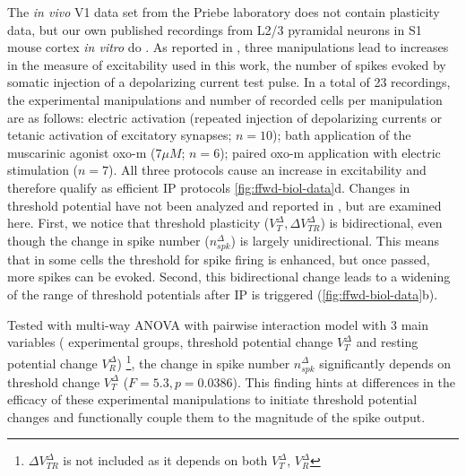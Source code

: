 The \textit{in vivo} V1 data set \citep{Li2020-ej} from the Priebe laboratory does not contain plasticity data,
        but our own published recordings from L2/3 pyramidal neurons in S1 mouse cortex \textit{in vitro} do \citep{Gill2020-wy}.
    As reported in \cite{Gill2020-wy}, three manipulations lead to increases in the measure of excitability used in this work,
        the number of spikes evoked by somatic injection of a depolarizing current test pulse.
    In a total of 23 recordings, the experimental manipulations and number of recorded cells per manipulation are as follows:
        electric activation (repeated injection of depolarizing currents or tetanic activation of excitatory synapses; $n=10$);
        bath application of the muscarinic agonist oxo-m ($7 \mu M$; $n=6$);
        paired oxo-m application with electric stimulation ($n=7$).
    All three protocols cause an increase in excitability \citep{Gill2020-wy}
        and therefore qualify as efficient IP protocols \autoref{fig:ffwd-biol-data}d.
    Changes in threshold potential have not been analyzed and reported in \cite{Gill2020-wy},
        but are examined here.
    First, we notice that threshold plasticity ($V_T^{\Delta}, \Delta V_{TR}^{\Delta}$) is bidirectional,
        even though the change in spike number ($n_{spk}^{\Delta}$) is largely unidirectional.
    This means that in some cells the threshold for spike firing is enhanced,
        but once passed, more spikes can be evoked.
    Second, this bidirectional change leads to a widening of the range of threshold potentials
        after IP is triggered (\autoref{fig:ffwd-biol-data}b).

Tested with multi-way ANOVA with pairwise interaction model
    with 3 main variables (%
        experimental groups,
        threshold potential change $V_T^{\Delta}$
        and resting potential change $V_R^{\Delta}$)
        \footnote{$\Delta V_{TR}^{\Delta}$ is not included
            as it depends on both $V_T^{\Delta}$, $V_R^{\Delta}$},
    the change in spike number $n_{spk}^{\Delta}$ significantly
        depends on threshold change $V_T^{\Delta}$
        ($F = 5.3, p = 0.0386$).
    This finding hints at differences in the efficacy of these experimental manipulations to initiate threshold potential changes and functionally couple them to the magnitude of the spike output.

